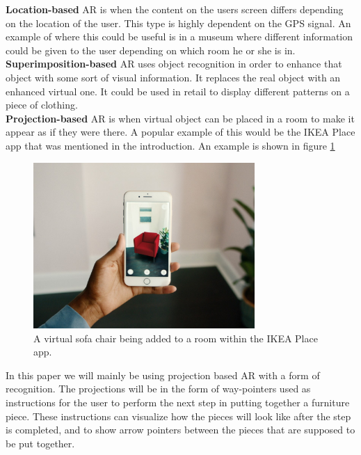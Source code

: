 \textbf{Location-based} AR is when the content on the users screen differs depending on the location of the user. This type is highly dependent on the GPS signal.
An example of where this could be useful is in a museum where different information could be given to the user depending on which room he or she is in.\\

\textbf{Superimposition-based} AR uses object recognition in order to enhance that object with some sort of visual information. It replaces the real object with an enhanced virtual one. It could be used in retail to display different patterns on a piece of clothing.\\

\textbf{Projection-based} AR is when virtual object can be placed in a room to make it appear as if they were there. A popular example of this would be the IKEA Place app that was mentioned in the introduction. An example is shown in figure \ref{fig:projection-based-ar} \\

\begin{figure}[hbtp]
\begin{center}
\includegraphics[width = 0.75\textwidth]{./Images/ikeaplace.jpg} 
\caption{A virtual sofa chair being added to a room within the IKEA Place app.}
\label{fig:projection-based-ar}
\end{center}
\end{figure}

In this paper we will mainly be using projection based AR with a form of recognition. The projections will be in the form of way-pointers used as instructions for the user to perform the next step in putting together a furniture piece. These instructions can visualize how the pieces will look like after the step is completed, and to show arrow pointers between the pieces that are supposed to be put together.

